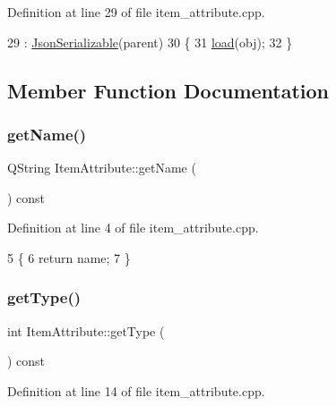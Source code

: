Definition at line 29 of file item\+\_\+attribute.\+cpp.


\begin{DoxyCode}
29                                                           : \hyperlink{class_json_serializable_ab5bc08152c95bca5aad8f1a4e2c09998}{JsonSerializable}(parent)
30 \{
31     \hyperlink{class_item_attribute_a5504e3f5abf4e2f48eba7893fc6d297e}{load}(obj);
32 \}
\end{DoxyCode}


\subsection{Member Function Documentation}
\mbox{\label{class_item_attribute_a1e858380efb11bbbc7edd241059cee96}} 
\subsubsection{\texorpdfstring{get\+Name()}{getName()}}
{\footnotesize\ttfamily Q\+String Item\+Attribute\+::get\+Name (\begin{DoxyParamCaption}{ }\end{DoxyParamCaption}) const}



Definition at line 4 of file item\+\_\+attribute.\+cpp.


\begin{DoxyCode}
5 \{
6     \textcolor{keywordflow}{return} name;
7 \}
\end{DoxyCode}
\mbox{\label{class_item_attribute_a3eec36cbf8033331845d89de15754b83}} 
\subsubsection{\texorpdfstring{get\+Type()}{getType()}}
{\footnotesize\ttfamily int Item\+Attribute\+::get\+Type (\begin{DoxyParamCaption}{ }\end{DoxyParamCaption}) const}



Definition at line 14 of file item\+\_\+attribute.\+cpp.


